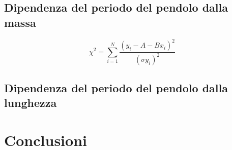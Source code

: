 \documentclass[10pt]{article}
\begin{document}
\begin{large}
\subsection{Dipendenza del periodo del pendolo dalla massa}

\begin{equation}
	\label{test_chi2}
    \chi^2 = \sum_{i=1}^N \frac{(y_i - A -Bx_i)^2}{(\sigma y_i)^2}
\end{equation}
\subsection{Dipendenza del periodo del pendolo dalla lunghezza}
\section{Conclusioni}
\end{large}


\end{document}
